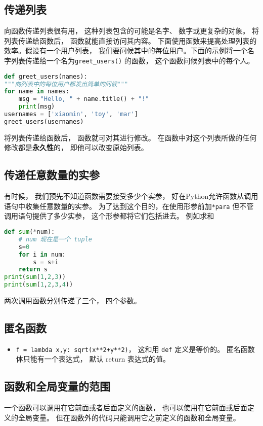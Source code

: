 \subsection{传递列表}
向函数传递列表很有用， 这种列表包含的可能是名字、 数字或更复杂的对象。 将列表传递给函数后， 函数就能直接访问其内容。 下面使用函数来提高处理列表的效率。假设有一个用户列表， 我们要问候其中的每位用户。下面的示例将一个名字列表传递给一个名为\verb|greet_users()| 的函数， 这个函数问候列表中的每个人。
\begin{lstlisting}[language=python]
def greet_users(names):
"""向列表中的每位用户都发出简单的问候"""
for name in names:
    msg = "Hello, " + name.title() + "!"
    print(msg)
usernames = ['xiaomin', 'toy', 'mar']
greet_users(usernames)
\end{lstlisting}
将列表传递给函数后， 函数就可对其进行修改。 在函数中对这个列表所做的任何修改都是\textbf{永久性}的， 即他可以改变原始列表。

\subsection{传递任意数量的实参}
有时候， 我们预先不知道函数需要接受多少个实参， 好在Python允许函数从调用语句中收集任意数量的实参。 为了达到这个目的，在使用形参前加\verb|*para| 但不管调用语句提供了多少实参， 这个形参都将它们包括进去。 例如求和
\begin{lstlisting}[language=python]
def sum(*num):
    # num 现在是一个 tuple
    s=0
    for i in num:
        s = s+i
    return s
print(sum(1,2,3))
print(sum(1,2,3,4))
\end{lstlisting}
两次调用函数分别传递了三个， 四个参数。

\subsection{匿名函数}
\begin{itemize}
\item \verb|f = lambda x,y: sqrt(x**2+y**2)|， 这和用 \verb|def| 定义是等价的。 匿名函数体只能有一个表达式， 默认 return 表达式的值。
\end{itemize}

\subsection{函数和全局变量的范围}

一个函数可以调用在它前面或者后面定义的函数， 也可以使用在它前面或后面定义的全局变量。 但在函数外的代码只能调用它之前定义的函数和全局变量。
